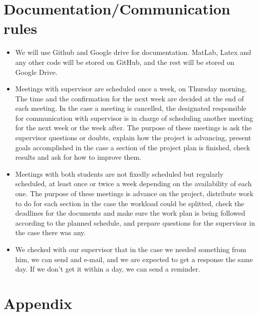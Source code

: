 \documentclass{article}
\begin{document}
	\section{Documentation/Communication rules}
	\begin{itemize}
			\item We will use Github and Google drive for documentation. MatLab, Latex and any other code will be stored on GitHub, and the rest will be stored on Google Drive.
			
			\item Meetings with supervisor are scheduled once a week, on Thursday morning. The time and the confirmation for the next week are decided at the end of each meeting. In the case a meeting is cancelled, the designated responsible for communication with supervisor is in charge of scheduling another meeting for the next week or the week after. The purpose of these meetings is ask the supervisor questions or doubts, explain how the project is advancing, present goals accomplished in the case a section of the project plan is finished, check results and ask for how to improve them.
			
			\item Meetings with both students are not fixedly scheduled but regularly scheduled, at least once or twice a week depending on the availability of each one. The purpose of these meetings is advance on the project, distribute work to do for each section in the case the workload could be splitted, check the deadlines for the documents and make sure the work plan is being followed according to the planned schedule, and prepare questions for the supervisor in the case there was any.
			
			\item We checked with our supervisor that in the case we needed something from him, we can send and e-mail, and we are expected to get a response the same day. If we don't get it within a day, we can send a reminder. 
			
	\end{itemize}

	
	\section{Appendix}
	
\end{document}
